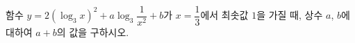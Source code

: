 함수 $y=2(\log_3 x)^2+a\log_3 \dfrac{1}{x^2}+b$가 $x=\dfrac{1}{3}$에서 최솟값 $1$을 가질 때, 상수 $a$, $b$에 대하여 $a+b$의 값을 구하시오.
